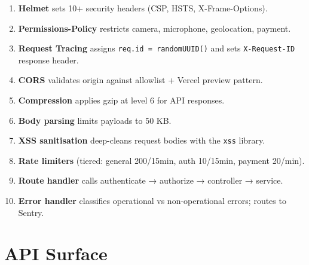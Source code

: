 \documentclass[11pt,a4paper,twoside]{book}
\begin{document}
\begin{enumerate}[leftmargin=1.5em]
  \item \textbf{Helmet} sets 10+ security headers (CSP, HSTS, X-Frame-Options).
  \item \textbf{Permissions-Policy} restricts camera, microphone, geolocation, payment.
  \item \textbf{Request Tracing} assigns \texttt{req.id = randomUUID()} and sets \texttt{X-Request-ID} response header.
  \item \textbf{CORS} validates origin against allowlist + Vercel preview pattern.
  \item \textbf{Compression} applies gzip at level 6 for API responses.
  \item \textbf{Body parsing} limits payloads to 50 KB.
  \item \textbf{XSS sanitisation} deep-cleans request bodies with the \texttt{xss} library.
  \item \textbf{Rate limiters} (tiered: general 200/15min, auth 10/15min, payment 20/min).
  \item \textbf{Route handler} calls authenticate → authorize → controller → service.
  \item \textbf{Error handler} classifies operational vs non-operational errors; routes to Sentry.
\end{enumerate}

\section{API Surface}
\end{document}
